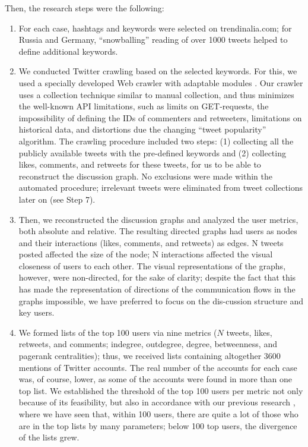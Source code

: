 Then, the research steps were the following:
\begin{enumerate}
	\item For each case, hashtags and keywords were selected on trendinalia.com; for Russia and Germany, “snowballing” reading of over 1000 tweets helped to define additional keywords.
	
	\item We conducted Twitter crawling based on the selected keywords. For this, we used a specially developed Web crawler with adaptable modules \cite{BlekanovSergeevMartynenko}. Our crawler uses a collection technique similar to manual collection, and thus minimizes the well-known API limitations, such as limits on GET-requests, the impossibility of defining the IDs of commenters and retweeters, limitations on historical data, and distortions due the changing “tweet popularity” algorithm. The crawling procedure included two steps: (1) collecting all the publicly available tweets with the pre-defined keywords and (2) collecting likes, comments, and retweets for these tweets, for us to be able to reconstruct the discussion graph. No exclusions were made within the automated procedure; irrelevant tweets were eliminated from tweet collections later on (see Step 7).
	
	\item Then, we reconstructed the discussion graphs and analyzed the user metrics, both absolute and relative. The resulting directed graphs had users as nodes and their interactions (likes, comments, and retweets) as edges. N tweets posted affected the size of the node; N interactions affected the visual closeness of users to each other. The visual representations of the graphs, however, were non-directed, for the sake of clarity; despite the fact that this has made the representation of directions of the communication flows in the graphs impossible, we have preferred to focus on the dis-cussion structure and key users.
	
	\item We formed lists of the top 100 users via nine metrics (\(N\) tweets, likes, retweets, and comments; indegree, outdegree, degree, betweenness, and pagerank centralities); thus, we received lists containing altogether 3600 mentions of Twitter accounts. The real number of the accounts for each case was, of course, lower, as some of the accounts were found in more than one top list. We established the threshold of the top 100 users per metric not only because of its feasibility, but also in accordance with our previous research \cite{BodrunovaLitvinenkoBlekanov2016,BodrunovaLitvinenkoBlekanov2017}, where we have seen that, within 100 users, there are quite a lot of those who are in the top lists by many parameters; below 100 top users, the divergence of the lists grew.
	

\end{enumerate}
